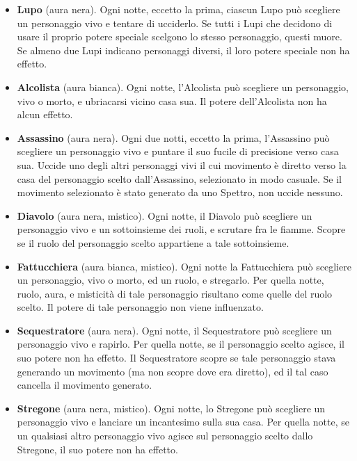 \documentclass[a4paper,10pt]{article}
\begin{document}
\begin{itemize}
	
	\item {\bf Lupo} (aura nera). Ogni notte, eccetto la prima, ciascun Lupo può scegliere un personaggio vivo e tentare di ucciderlo. Se tutti i Lupi che decidono di usare il proprio potere speciale scelgono lo stesso personaggio, questi muore. Se almeno due Lupi indicano personaggi diversi, il loro potere speciale non ha effetto.
	
	\item {\bf Alcolista} (aura bianca). Ogni notte, l'Alcolista può scegliere un personaggio, vivo o morto, e ubriacarsi vicino casa sua. Il potere dell'Alcolista non ha alcun effetto.
	
	\item {\bf Assassino} (aura nera). Ogni due notti, eccetto la prima, l'Assassino può scegliere un personaggio vivo e puntare il suo fucile di precisione verso casa sua. Uccide uno degli altri personaggi vivi il cui movimento è diretto verso la casa del personaggio scelto dall'Assassino, selezionato in modo casuale. Se il movimento selezionato è stato generato da uno Spettro, non uccide nessuno.

	\item {\bf Diavolo} (aura nera, mistico). Ogni notte, il Diavolo può scegliere un personaggio vivo e un sottoinsieme dei ruoli, e scrutare fra le fiamme. Scopre se il ruolo del personaggio scelto appartiene a tale sottoinsieme.
 
	\item {\bf Fattucchiera} (aura bianca, mistico). Ogni notte la Fattucchiera può scegliere un personaggio, vivo o morto, ed un ruolo, e stregarlo. Per quella notte, ruolo, aura, e misticità di tale personaggio risultano come quelle del ruolo scelto. Il potere di tale personaggio non viene influenzato.

	\item {\bf Sequestratore} (aura nera). Ogni notte, il Sequestratore può scegliere un personaggio vivo e rapirlo. Per quella notte, se il personaggio scelto agisce, il suo potere non ha effetto. Il Sequestratore scopre se tale personaggio stava generando un movimento (ma non scopre dove era diretto), ed il tal caso cancella il movimento generato.
	
	\item {\bf Stregone} (aura nera, mistico). Ogni notte, lo Stregone può scegliere un personaggio vivo e lanciare un incantesimo sulla sua casa. Per quella notte, se un qualsiasi altro personaggio vivo agisce sul personaggio scelto dallo Stregone, il suo potere non ha effetto.
 
\end{itemize}
\end{document}
